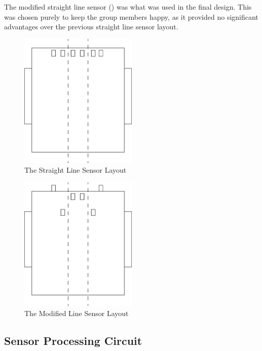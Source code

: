 \documentclass{article}
\begin{document}
The modified straight line sensor  () was what was used in the final design. This was chosen purely to keep the group members happy, as it provided no significant advantages over the previous straight line sensor layout.

\begin{figure}[!h]
\centerline{\includegraphics[width=0.5\textwidth]{the_straight_line_sensor}}
\caption{The Straight Line Sensor Layout}
\label{fig:the_straight_line_sensor}
\end{figure}

\begin{figure}[!h]
\centerline{\includegraphics[width=0.5\textwidth]{modified_straight_line_sensor}}
\caption{The Modified Line Sensor Layout}
\label{fig:modified_straight_line_sensor}
\end{figure}

\clearpage

\subsection{Sensor Processing Circuit}
\end{document}
